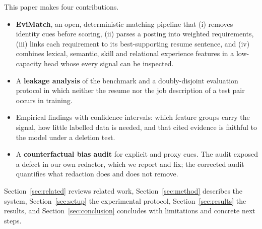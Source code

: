 This paper makes four contributions.
\begin{itemize}
\item \textbf{EviMatch}, an open, deterministic matching pipeline that (i) removes identity cues before
  scoring, (ii) parses a posting into weighted requirements, (iii) links each requirement to its
  best-supporting resume sentence, and (iv) combines lexical, semantic, skill and relational
  experience features in a low-capacity head whose every signal can be inspected.
\item A \textbf{leakage analysis} of the benchmark and a doubly-disjoint evaluation protocol in which
  neither the resume nor the job description of a test pair occurs in training.
\item Empirical findings with confidence intervals: which feature groups carry the signal, how little
  labelled data is needed, and that cited evidence is faithful to the model under a deletion test.
\item A \textbf{counterfactual bias audit} for explicit and proxy cues. The audit exposed a defect in our own
  redactor, which we report and fix; the corrected audit quantifies what redaction does and does not remove.
\end{itemize}

Section~\ref{sec:related} reviews related work, Section~\ref{sec:method} describes the system,
Section~\ref{sec:setup} the experimental protocol, Section~\ref{sec:results} the results, and
Section~\ref{sec:conclusion} concludes with limitations and concrete next steps.

